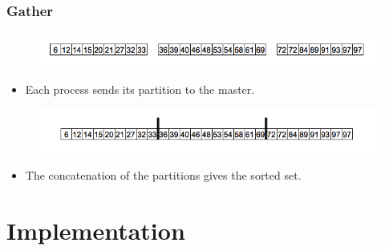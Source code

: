 \documentclass{beamer}
\begin{document}
\begin{frame}
	\frametitle{Gather}
	\begin{figure}
		\begin{center}
			\includegraphics[width=\textwidth]{images/08localorder2.png}
		\end{center}
	\end{figure}
	
	\begin{itemize}
		\item{Each process sends its partition to the master.}
	\end{itemize}
	
	\pause
	\begin{figure}
		\begin{center}
			\includegraphics[width=\textwidth]{images/09final.png}
		\end{center}
	\end{figure}
	
	\begin{itemize}
		\item{The concatenation of the partitions gives the sorted set.}
	\end{itemize}
\end{frame}










\section{Implementation}
\end{document}
